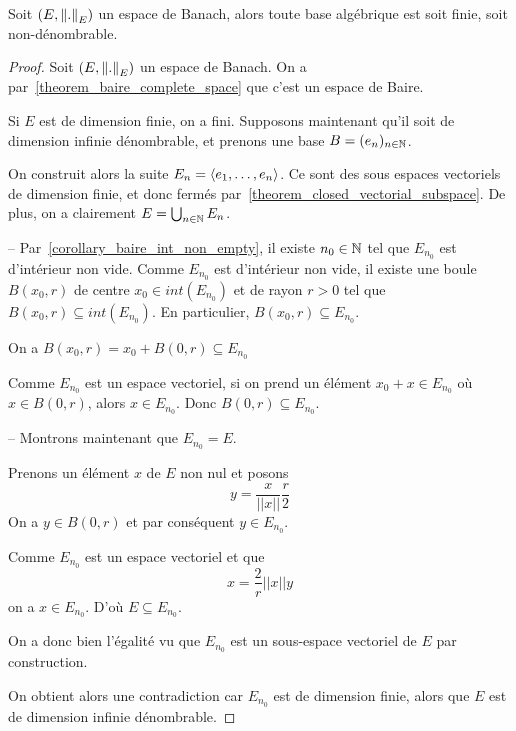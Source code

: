 \begin{proposition}
\label{proposition_basis_banach_space}
	Soit $(E, \norm{.}_{E})$ un espace de Banach, alors toute base algébrique est soit finie, soit
	non-dénombrable.
\end{proposition}

\ifdefined\outputproof
\begin{proof}
	Soit $(E, \norm{.}_{E})$ un espace de Banach.
	On a par~\ref{theorem_baire_complete_space} que c'est un espace de Baire.

	Si $E$ est de dimension finie, on a fini.
	Supposons maintenant qu'il soit de dimension infinie dénombrable, et prenons
	une base $B = (e_{n})_{n \in \mathbb{N}}$.

	On construit alors la suite $E_{n} = \left<e_{1}, \ldots, e_{n}\right>$. Ce sont des
	sous espaces vectoriels de dimension finie, et donc fermés
	par~\ref{theorem_closed_vectorial_subspace}. De plus, on a
	clairement $E = \bigcup_{n \in \mathbb{N}} E_{n}$.

	-- Par~\ref{corollary_baire_int_non_empty}, il existe $n_{0} \in \mathbb{N}$ tel que $E_{n_{0}}$ est d'intérieur non
	vide.
	Comme $E_{n_{0}}$ est d'intérieur non vide, il existe une
	boule $B(x_{0}, r)$ de centre $x_{0} \in int({E_{n_{0}}})$ et de rayon $r > 0$ tel que
	$B(x_{0}, r) \subseteq int(E_{n_{0}})$. En particulier, $B(x_{0}, r)
	\subseteq E_{n_{0}}$.
	
	On a $B(x_{0}, r) = x_{0} + B(0, r) \subseteq
	E_{n_{0}}$

	Comme $E_{n_{0}}$ est un espace vectoriel, si on prend un
	élément $x_{0} + x \in E_{n_{0}}$ où $x \in B(0, r)$, alors $x \in E_{n_{0}}$.
	Donc $B(0, r) \subseteq E_{n_{0}}$.

	-- Montrons maintenant que $E_{n_{0}} = E$.

	Prenons un élément $x$ de $E$ non nul et posons
	\begin{equation}
		y = \frac{x}{||x||} \frac{r}{2}
	\end{equation}
	On a $y \in B(0, r)$ et par conséquent $y \in E_{n_{0}}$.
	
	Comme $E_{n_{0}}$ est un espace vectoriel et que 
	\begin{equation}
		x = \frac{2}{r} ||x|| y
	\end{equation}
	on a $x \in E_{n_{0}}$. D'où $E \subseteq E_{n_{0}}$.
	
	On a donc bien l'égalité vu que $E_{n_{0}}$ est un sous-espace vectoriel de
	$E$ par construction.

	On obtient alors une contradiction car $E_{n_{0}}$ est de dimension finie,
	alors que $E$ est de dimension infinie dénombrable.
\end{proof}
\fi

